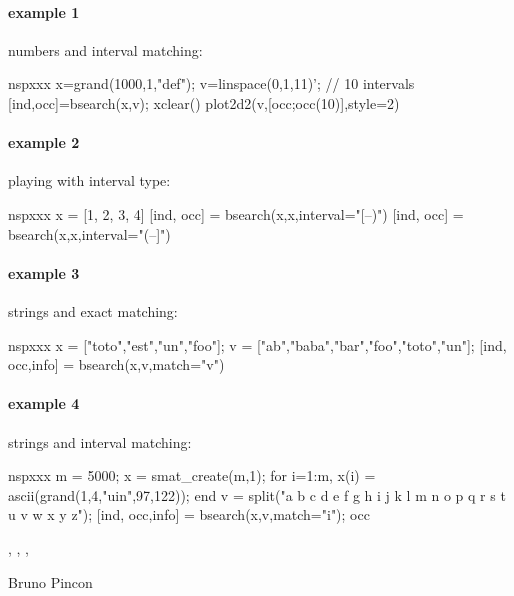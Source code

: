 \begin{examples}
  
\paragraph{example 1} numbers and interval matching:
\begin{mintednsp}{nspxxx}
x=grand(1000,1,"def");
    v=linspace(0,1,11)';  // 10 intervals 
    [ind,occ]=bsearch(x,v);
    xclear()
    plot2d2(v,[occ;occ(10)],style=2)
\end{mintednsp}
  
\paragraph{example 2} playing with interval type:
\begin{mintednsp}{nspxxx}
x = [1, 2, 3, 4]
[ind, occ] = bsearch(x,x,interval="[--)")
[ind, occ] = bsearch(x,x,interval="(--]")
\end{mintednsp}
  
\paragraph{example 3} strings and exact matching:
\begin{mintednsp}{nspxxx}
x = ["toto","est","un","foo"];
v = ["ab","baba","bar","foo","toto","un"];
[ind, occ,info] = bsearch(x,v,match="v")
\end{mintednsp}
  
\paragraph{example 4} strings and interval matching:
\begin{mintednsp}{nspxxx}
m = 5000;
    x = smat_create(m,1);
    for i=1:m, x(i) = ascii(grand(1,4,"uin",97,122)); end
    v = split("a b c d e f g h i j k l m n o p q r s t u v w x y z");
    [ind, occ,info] = bsearch(x,v,match="i");
    occ
  \end{mintednsp}
  
\end{examples}

\begin{manseealso}
  , , ,   
\end{manseealso}

\begin{authors}
  Bruno Pincon
\end{authors}
